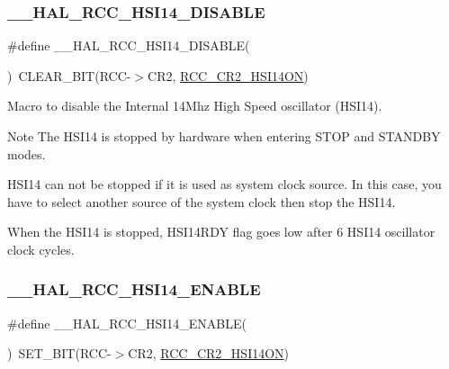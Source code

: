 \subsubsection{\texorpdfstring{\+\_\+\+\_\+\+H\+A\+L\+\_\+\+R\+C\+C\+\_\+\+H\+S\+I14\+\_\+\+D\+I\+S\+A\+B\+LE}{\_\_HAL\_RCC\_HSI14\_DISABLE}}
{\footnotesize\ttfamily \#define \+\_\+\+\_\+\+H\+A\+L\+\_\+\+R\+C\+C\+\_\+\+H\+S\+I14\+\_\+\+D\+I\+S\+A\+B\+LE(\begin{DoxyParamCaption}{ }\end{DoxyParamCaption})~C\+L\+E\+A\+R\+\_\+\+B\+IT(R\+CC-\/$>$C\+R2, \hyperlink{group___peripheral___registers___bits___definition_gaf600a82eec2d1445e91af6f98baf042e}{R\+C\+C\+\_\+\+C\+R2\+\_\+\+H\+S\+I14\+ON})}



Macro to disable the Internal 14\+Mhz High Speed oscillator (H\+S\+I14). 

\begin{DoxyNote}{Note}
The H\+S\+I14 is stopped by hardware when entering S\+T\+OP and S\+T\+A\+N\+D\+BY modes. 

H\+S\+I14 can not be stopped if it is used as system clock source. In this case, you have to select another source of the system clock then stop the H\+S\+I14. 

When the H\+S\+I14 is stopped, H\+S\+I14\+R\+DY flag goes low after 6 H\+S\+I14 oscillator clock cycles. 
\end{DoxyNote}
\mbox{\label{group___r_c_c___h_s_i14___configuration_gae918e3236290b9f03f6bd7dc192dceae}} 
\subsubsection{\texorpdfstring{\+\_\+\+\_\+\+H\+A\+L\+\_\+\+R\+C\+C\+\_\+\+H\+S\+I14\+\_\+\+E\+N\+A\+B\+LE}{\_\_HAL\_RCC\_HSI14\_ENABLE}}
{\footnotesize\ttfamily \#define \+\_\+\+\_\+\+H\+A\+L\+\_\+\+R\+C\+C\+\_\+\+H\+S\+I14\+\_\+\+E\+N\+A\+B\+LE(\begin{DoxyParamCaption}{ }\end{DoxyParamCaption})~S\+E\+T\+\_\+\+B\+IT(R\+CC-\/$>$C\+R2, \hyperlink{group___peripheral___registers___bits___definition_gaf600a82eec2d1445e91af6f98baf042e}{R\+C\+C\+\_\+\+C\+R2\+\_\+\+H\+S\+I14\+ON})}



